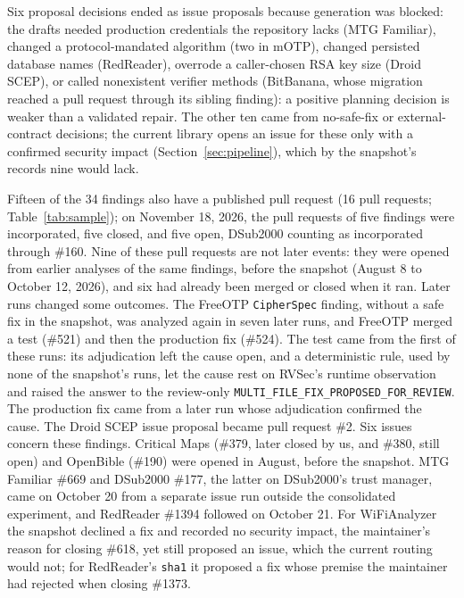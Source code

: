 \documentclass[conference]{IEEEtran}
\begin{document}
Six proposal decisions ended as issue proposals because generation was
blocked: the drafts needed production credentials the repository lacks (MTG
Familiar), changed a protocol-mandated algorithm (two in mOTP), changed
persisted database names (RedReader), overrode a caller-chosen RSA key size
(Droid SCEP), or called nonexistent verifier methods (BitBanana, whose
migration reached a pull request through its sibling finding): a positive
planning decision is weaker than a validated repair. The other ten came from
no-safe-fix or external-contract decisions; the current library opens an
issue for these only with a confirmed security impact
(Section~\ref{sec:pipeline}), which by the snapshot's records nine would lack.

Fifteen of the 34 findings also have a published pull request (16 pull
requests; Table~\ref{tab:sample}); on November 18, 2026, the pull requests of
five findings were incorporated, five closed, and five open, DSub2000 counting
as incorporated through \#160. Nine of these pull requests are not later
events: they were opened from earlier analyses of the same findings, before the
snapshot (August 8 to October 12, 2026), and six had already been merged or
closed when it ran. Later runs changed some outcomes. The FreeOTP
\texttt{CipherSpec} finding, without a safe fix in the snapshot, was analyzed
again in seven later runs, and FreeOTP merged a test (\#521) and then the
production fix (\#524). The test came from the first of these runs: its
adjudication left the cause open, and a deterministic rule, used by none of the
snapshot's runs, let the cause rest on RVSec's runtime observation and raised
the answer to the review-only
\texttt{MULTI\_FILE\_FIX\_}\allowbreak\texttt{PROPOSED\_FOR\_REVIEW}.
The production fix came from a later run whose adjudication confirmed the cause. The Droid SCEP issue proposal became pull request \#2. Six issues concern
these findings. Critical Maps (\#379, later closed by us, and \#380, still
open) and OpenBible (\#190) were opened in August, before the snapshot. MTG
Familiar \#669 and DSub2000 \#177, the latter on DSub2000's trust manager, came
on October 20 from a separate issue run outside the consolidated experiment,
and RedReader \#1394 followed on October 21.
For WiFiAnalyzer the snapshot declined a fix and recorded no security impact,
the maintainer's reason for closing \#618, yet still proposed an issue, which
the current routing would not; for RedReader's \texttt{sha1} it proposed a fix
whose premise the maintainer had rejected when closing \#1373.
\end{document}
